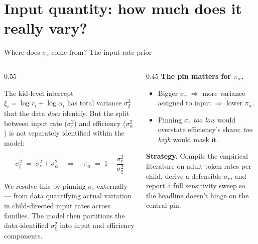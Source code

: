 \documentclass[
  ignorenonframetext,
  aspectratio=169,
  t]{beamer}
\providecommand{\tightlist}{%
  \setlength{\itemsep}{0pt}\setlength{\parskip}{0pt}}
\begin{document}
\section{Input quantity: how much does it really
vary?}\label{input-quantity-how-much-does-it-really-vary}

\begin{frame}{Where does \(\sigma_r\) come from? The input-rate prior}
\label{where-does-sigma_r-come-from-the-input-rate-prior}
\begin{columns}[T]
\begin{column}{0.55\linewidth}
\small

The kid-level intercept \(\xi_i = \log r_i + \log\alpha_i\) has total
variance \(\sigma_\xi^2\) that the data \emph{does} identify. But the
split between input rate (\(\sigma_r^2\)) and efficiency
(\(\sigma_\alpha^2\)) is not separately identified within the model:

\vspace{0.4em}

\[
\sigma_\xi^2 \;=\; \sigma_r^2 + \sigma_\alpha^2
\quad\Rightarrow\quad
\pi_\alpha \;=\; 1 - \frac{\sigma_r^2}{\sigma_\xi^2}
\] \vspace{0.4em}

We resolve this by pinning \(\sigma_r\) externally --- from data
quantifying actual variation in child-directed input rates across
families. The model then partitions the data-identified \(\sigma_\xi^2\)
into input and efficiency components.
\end{column}

\begin{column}{0.45\linewidth}
\textbf{The pin matters for \(\pi_\alpha\).}

\begin{itemize}
\tightlist
\item
  Bigger \(\sigma_r\) \(\Rightarrow\) more variance assigned to input
  \(\Rightarrow\) lower \(\pi_\alpha\).
\item
  Pinning \(\sigma_r\) \emph{too low} would overstate efficiency's
  share; \emph{too high} would mask it.
\end{itemize}

\vspace{0.5em}

\textbf{Strategy.} Compile the empirical literature on adult-token rates
per child, derive a defensible \(\sigma_r\), and report a full
sensitivity sweep so the headline doesn't hinge on the central pin.
\end{column}
\end{columns}
\end{frame}
\end{document}

